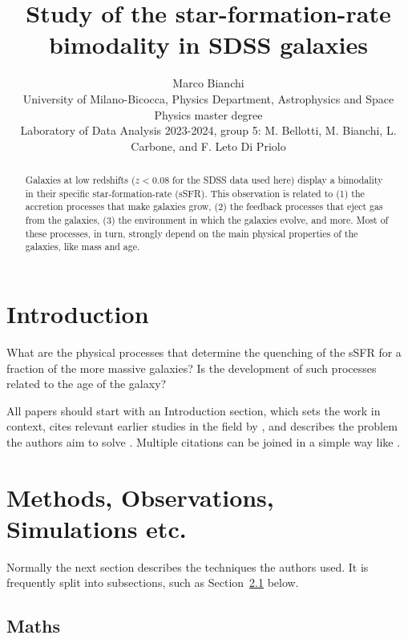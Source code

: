 \documentclass[fleqn,usenatbib]{mnras}
\title[Short title, max. 45 characters]{Study of the star-formation-rate bimodality in SDSS galaxies}
\author[M. Bianchi]{
Marco Bianchi
\\
University of Milano-Bicocca, Physics Department, Astrophysics and Space Physics master degree\\
Laboratory of Data Analysis 2023-2024, group 5: M. Bellotti, M. Bianchi, L. Carbone, and F. Leto Di Priolo\\
}
\begin{document}
\label{firstpage}
\pagerange{\pageref{firstpage}--\pageref{lastpage}}
\maketitle

\begin{abstract}
Galaxies at low redshifts ($z<0.08$ for the SDSS data used here) display a bimodality in their specific star-formation-rate (sSFR). This observation is related to (1) the accretion processes that make galaxies grow, (2) the feedback processes that eject gas from the galaxies, (3) the environment in which the galaxies evolve, and more. Most of these processes, in turn, strongly depend on the main physical properties of the galaxies, like mass and age.

\end{abstract} 






\section{Introduction}

What are the physical processes that determine the quenching of the sSFR for a fraction of the more massive galaxies? 
Is the development of such processes related to the age of the galaxy?

All papers should start with an Introduction section, which sets the work
in context, cites relevant earlier studies in the field by \citet{Fournier1901},
and describes the problem the authors aim to solve \citep[e.g.][]{vanDijk1902}.
Multiple citations can be joined in a simple way like \citet{deLaguarde1903, delaGuarde1904}.

\section{Methods, Observations, Simulations etc.}

Normally the next section describes the techniques the authors used.
It is frequently split into subsections, such as Section~\ref{sec:maths} below.

\subsection{Maths}
\label{sec:maths} %
\end{document}
